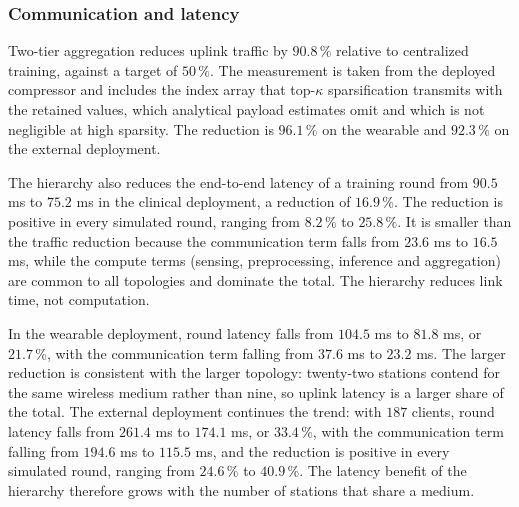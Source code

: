 \subsubsection{Communication and latency}
Two-tier aggregation reduces uplink traffic by $90.8\,\%$ relative to
centralized training, against a target of $50\,\%$. The measurement is taken
from the deployed compressor and includes the index array that top-$\kappa$
sparsification transmits with the retained values, which analytical payload
estimates omit and which is not negligible at high sparsity. The reduction is
$96.1\,\%$ on the wearable and $92.3\,\%$ on the external deployment.

The hierarchy also reduces the end-to-end latency of a training round from
$90.5$ ms to $75.2$ ms in the clinical deployment, a reduction of $16.9\,\%$.
The reduction is positive in every simulated round, ranging from $8.2\,\%$ to
$25.8\,\%$. It is smaller than the traffic reduction because the communication
term falls from $23.6$ ms to $16.5$ ms, while the compute terms (sensing,
preprocessing, inference and aggregation) are common to all topologies and
dominate the total. The hierarchy reduces link time, not computation.

In the wearable deployment, round latency falls from $104.5$ ms to $81.8$ ms,
or $21.7\,\%$, with the communication term falling from $37.6$ ms to
$23.2$ ms. The larger reduction is consistent with the larger topology:
twenty-two stations contend for the same wireless medium rather than nine, so
uplink latency is a larger share of the total. The external deployment
continues the trend: with $187$ clients, round latency falls from $261.4$ ms to
$174.1$ ms, or $33.4\,\%$, with the communication term falling from
$194.6$ ms to $115.5$ ms, and the reduction is positive in every simulated
round, ranging from $24.6\,\%$ to $40.9\,\%$. The latency benefit of the
hierarchy therefore grows with the number of stations that share a medium.

